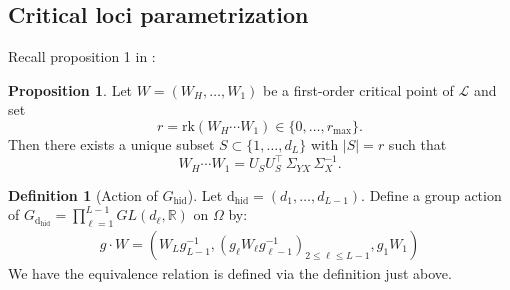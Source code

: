 \documentclass{article}
\newcommand{\hid}{\operatorname{hid}}
\newcommand{\dhid}{\operatorname{d_{hid}}}
\newcommand{\R}{\mathbb{R}}
\theoremstyle{definition}
\newtheorem{proposition}[theorem]{Proposition}
\newtheorem{definition}[theorem]{Definition}
\begin{document}
\subsection{Critical loci parametrization}
Recall proposition 1 in \cite{achour2024loss}:
\begin{proposition}
Let $W = (W_H, \dots, W_1)$ be a first-order critical point of $\mathcal{L}$ and set
\[
r = \text{rk}(W_H \cdots W_1) \in \{ 0, \dots, r_{\max} \}.
\]
Then there exists a unique subset $S \subset \{ 1, \dots, d_L \}$ with $|S| = r$ such that
\[
W_H \cdots W_1 = U_S U_S^\top \, \Sigma_{YX} \, \Sigma_{X}^{-1}.
\]
\end{proposition}
\begin{definition}[Action of $G_{\hid}$] Let $\dhid = (d_1, \dots, d_{L-1})$. Define a group action of $G_{\dhid} = \prod_{\ell=1}^{L-1} GL(d_\ell,\R)$ on $\Omega$ by:
\begin{align*}
    g\cdot W = (W_Lg_{L-1}^{-1}, (g_\ell W_\ell g_{\ell-1}^{-1})_{2\leq \ell \leq L-1}, g_1W_1)
\end{align*}
We have the equivalence relation is defined via the definition just above.
\end{definition}
\end{document}
